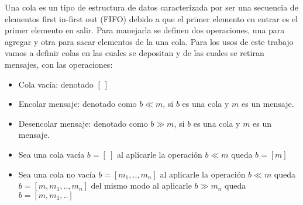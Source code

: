 \begin{definition}[Cola]
\label{def:cola}
Una cola es un tipo de estructura de datos caracterizada por ser una secuencia de elementos first in-first out (FIFO) debido a que el primer elemento en entrar es el primer elemento en salir. Para manejarla se definen dos operaciones, una para agregar y otra para sacar elementos de la una cola. Para los usos de este trabajo vamos a definir colas en las cuales se depositan y de las cuales se retiran mensajes, con las operaciones:

\begin{itemize}
\item Cola vacía: denotado $[\ ]$
\item Encolar mensaje: denotado como $b \ll m$, si $b$ es una cola y $m$ es un mensaje.
\item Desencolar mensaje: denotado como $b \gg m$, si $b$ es una cola y $m$ es un mensaje.
\item Sea una cola vacía $b= [\ ]$ al aplicarle la operación $b \ll m$ queda $b= [m]$
\item Sea una cola no vacía $b= [m_1,..,m_n]$ al aplicarle la operación $b \ll m$ queda $b= [m,m_1,..,m_n]$ del mismo modo al aplicarle $b \gg m_n$ queda $b= [m,m_1,..]$
\end{itemize}
\end{definition}

